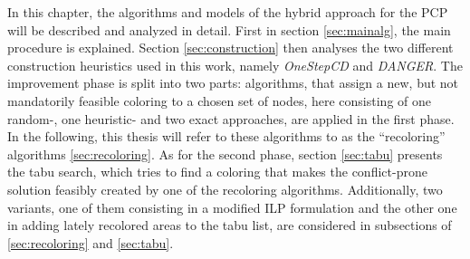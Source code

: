 In this chapter, the algorithms and models of the hybrid approach for the PCP will be described and analyzed in detail. First in section \ref{sec:mainalg}, the main procedure is explained. Section \ref{sec:construction} then analyses the two different construction heuristics used in this work, namely \textit{OneStepCD} and \textit{DANGER}. The improvement phase is split into two parts: algorithms, that assign a new, but not mandatorily feasible coloring to a chosen set of nodes, here consisting of one random-, one heuristic- and two exact approaches, are applied in the first phase. In the following, this thesis will refer to these algorithms to as the ``recoloring'' algorithms \ref{sec:recoloring}. As for the second phase, section \ref{sec:tabu} presents the tabu search, which tries to find a coloring that makes the conflict-prone solution feasibly created by one of the recoloring algorithms. Additionally, two variants, one of them consisting in a modified ILP formulation and the other one in adding lately recolored areas to the tabu list, are considered in subsections of \ref{sec:recoloring} and \ref{sec:tabu}.

